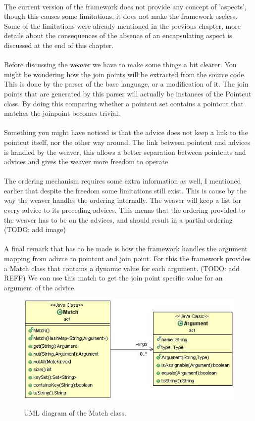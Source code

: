 \documentclass[a4paper]{report}
\begin{document}
\\
The current version of the framework does not provide any concept of 'aspects', though this causes some limitations, it does not make the framework useless. Some of the limitations were already mentioned in the previous chapter, more details about the consequences of the absence of an encapsulating aspect is discussed at the end of this chapter.\\
\\
Before discussing the weaver we have to make some things a bit clearer. You might be wondering how the join points will be extracted from the source code. This is done by the parser of the base language, or a modification of it. The join points that are generated by this parser will actually be instances of the Pointcut class. By doing this comparing whether a pointcut set contains a pointcut that matches the joinpoint becomes trivial.\\
\\
Something you might have noticed is that the advice does not keep a link to the pointcut itself, nor the other way around. The link between pointcut and advices is handled by the weaver, this allows a better separation between pointcuts and advices and gives the weaver more freedom to operate.\\
\\
The ordering mechanism requires some extra information as well, I mentioned earlier that despite the freedom some limitations still exist. This is cause by the way the weaver handles the ordering internally. The weaver will keep a list for every advice to its preceding advices. This means that the ordering provided to the weaver has to be on the advices, and should result in a partial ordering (TODO: add image)\\
\\
A final remark that has to be made is how the framework handles the argument mapping from adivce to pointcut and join point. For this the framework provides a Match class that contains a dynamic value for each argument. (TODO: add REFF) We can use this match to get the join point specific value for an argument of the advice.
\begin{figure}[h!]
\centering
\includegraphics[scale=0.7]{images/AOF/Match.jpg}
\label{fig:Match}
\caption{UML diagram of the Match class.}
\end{figure}\\
\end{document}
